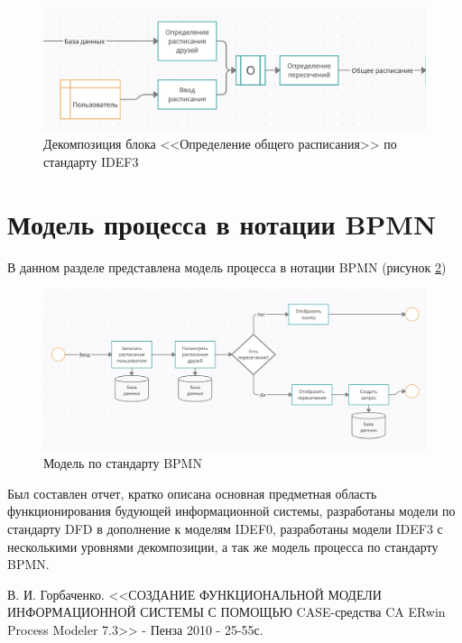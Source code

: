 \documentclass[14pt]{extreport}
\begin{document}
\begin{landscape}
            \begin{figure}[h]   
                \centering
                \includegraphics[width=0.9\linewidth]{img/IDEF3-2-1.png}
                \caption{ Декомпозиция блока <<Определение общего расписания>> по стандарту IDEF3}
                \label{fig:d8}
            \end{figure}
        \end{landscape}

    \section{Модель процесса в нотации BPMN}
        В данном разделе представлена модель процесса в нотации BPMN (рисунок \ref{fig:d9})
        \begin{figure}[h]   
            \centering
            \includegraphics[width=0.9\linewidth]{img/BPMN.png}
            \caption{ Модель по стандарту BPMN}
            \label{fig:d9}
        \end{figure}

\conclusions

Был составлен отчет, кратко описана основная предметная область функционирования будующей информационной системы, разработаны модели по стандарту DFD в дополнение к моделям IDEF0, разработаны модели IDEF3 с несколькими уровнями декомпозиции, а так же модель процесса по стандарту BPMN.

\newpage
\begin{thebibliography}{99}
	 	\label{bib:bib1} В. И. Горбаченко. <<СОЗДАНИЕ ФУНКЦИОНАЛЬНОЙ МОДЕЛИ ИНФОРМАЦИОННОЙ СИСТЕМЫ С ПОМОЩЬЮ CASE-средства CA ERwin Process Modeler 7.3>> - Пенза 2010 - 25-55с.
\end{thebibliography}
\end{document}
